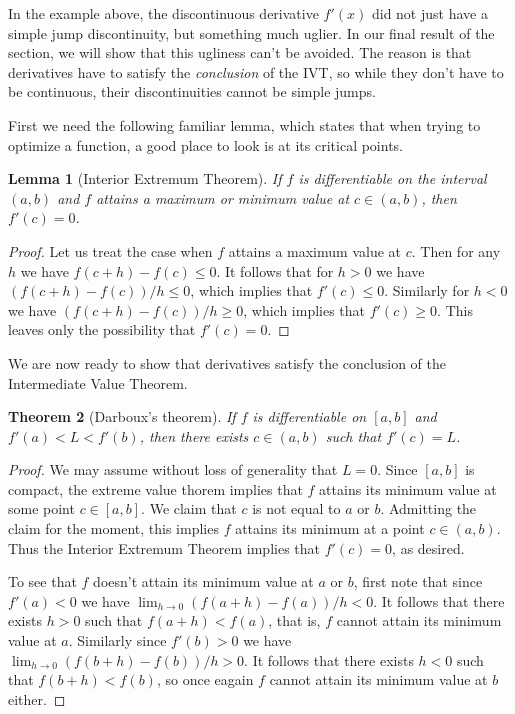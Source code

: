 \documentclass[11pt,oneside]{amsbook}
\theoremstyle{definition}
\theoremstyle{plain}
\newtheorem{theorem}{Theorem}[section]
\newtheorem{lemma}[theorem]{Lemma}
\theoremstyle{definition}
\theoremstyle{remark}
\numberwithin{equation}{section}
\numberwithin{figure}{section}
\begin{document}
In the example above, the discontinuous derivative $f'(x)$ did not just have a simple jump discontinuity, but something much uglier. In our final result of the section, we will show that this ugliness can't be avoided. The reason is that derivatives have to satisfy the \emph{conclusion} of the IVT, so while they don't have to be continuous, their discontinuities cannot be simple jumps.

First we need the following familiar lemma, which states that when trying to optimize a function, a good place to look is at its critical points.

\begin{lemma}[Interior Extremum Theorem]
  \label{thm:iet}
  If $f$ is differentiable on the interval $(a,b)$ and $f$ attains a maximum or minimum value at $c\in(a,b)$, then $f'(c)=0$.
\end{lemma}

\begin{proof}
  Let us treat the case when $f$ attains a maximum value at $c$. Then for any $h$ we have $f(c+h)-f(c)\leq0$. It follows that for $h>0$ we have $(f(c+h)-f(c))/h\leq0$, which implies that $f'(c)\leq0$. Similarly for $h<0$ we have $(f(c+h)-f(c))/h\geq0$, which implies that $f'(c)\geq0$. This leaves only the possibility that $f'(c)=0$.
\end{proof}

We are now ready to show that derivatives satisfy the conclusion of the Intermediate Value Theorem.

\begin{theorem}[Darboux's theorem]
  If $f$ is differentiable on $[a,b]$ and $f'(a)<L<f'(b)$, then there exists $c\in(a,b)$ such that $f'(c)=L$.
\end{theorem}

\begin{proof}
  We may assume without loss of generality that $L=0$. Since $[a,b]$ is compact, the extreme value thorem implies that $f$ attains its minimum value at some point $c\in[a,b]$. We claim that $c$ is not equal to $a$ or $b$. Admitting the claim for the moment, this implies $f$ attains its minimum at a point $c\in(a,b)$. Thus the Interior Extremum Theorem implies that $f'(c)=0$, as desired.

  To see that $f$ doesn't attain its minimum value at $a$ or $b$, first note that since $f'(a)<0$ we have $\lim_{h\to0}(f(a+h)-f(a))/h<0$. It follows that there exists $h>0$ such that $f(a+h)<f(a)$, that is, $f$ cannot attain its minimum value at $a$. Similarly since $f'(b)>0$ we have $\lim_{h\to0}(f(b+h)-f(b))/h>0$. It follows that there exists $h<0$ such that $f(b+h)<f(b)$, so once eagain $f$ cannot attain its minimum value at $b$ either.
\end{proof}
\end{document}
